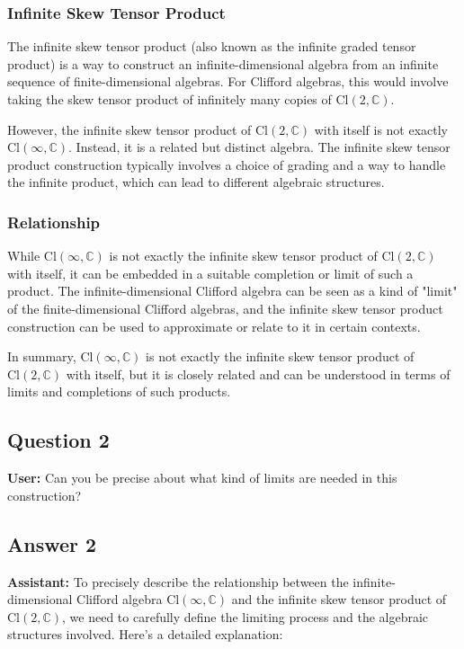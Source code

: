 \documentclass{article}
\begin{document}
\subsubsection{Infinite Skew Tensor Product}

The infinite skew tensor product (also known as the infinite graded tensor
product) is a way to construct an infinite-dimensional algebra from an
infinite sequence of finite-dimensional algebras. For Clifford algebras,
this would involve taking the skew tensor product of infinitely many copies
of $\text{Cl}(2, \mathbb{C})$.

However, the infinite skew tensor product of $\text{Cl}(2, \mathbb{C})$ with
itself is not exactly $\text{Cl}(\infty, \mathbb{C})$. Instead, it is a
related but distinct algebra. The infinite skew tensor product construction
typically involves a choice of grading and a way to handle the infinite
product, which can lead to different algebraic structures.

\subsubsection{Relationship}

While $\text{Cl}(\infty, \mathbb{C})$ is not exactly the infinite skew
tensor product of $\text{Cl}(2, \mathbb{C})$ with itself, it can be embedded
in a suitable completion or limit of such a product. The
infinite-dimensional Clifford algebra can be seen as a kind of "limit" of
the finite-dimensional Clifford algebras, and the infinite skew tensor
product construction can be used to approximate or relate to it in certain
contexts.

In summary, $\text{Cl}(\infty, \mathbb{C})$ is not exactly the infinite skew
tensor product of $\text{Cl}(2, \mathbb{C})$ with itself, but it is closely
related and can be understood in terms of limits and completions of such
products.

\subsection{Question 2}

\textbf{User:} Can you be precise about what kind of limits are needed in
this construction?

\subsection{Answer 2}

\textbf{Assistant:} To precisely describe the relationship between the
infinite-dimensional Clifford algebra $\text{Cl}(\infty, \mathbb{C})$ and
the infinite skew tensor product of $\text{Cl}(2, \mathbb{C})$, we need to
carefully define the limiting process and the algebraic structures involved.
Here's a detailed explanation:
\end{document}
